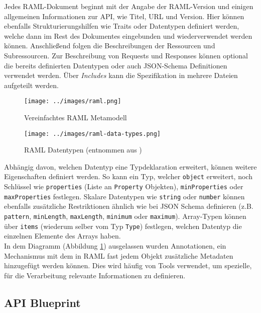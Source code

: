 Jedes RAML-Dokument beginnt mit der Angabe der RAML-Version und einigen allgemeinen Informationen zur API, wie Titel, URL und Version. Hier können ebenfalls Strukturierungshilfen wie Traits oder Datentypen definiert werden, welche dann im Rest des Dokumentes eingebunden und wiederverwendet werden können. Anschließend folgen die Beschreibungen der Ressourcen und Subressourcen. Zur Beschreibung von Requests und Responses können optional die bereits definierten Datentypen oder auch JSON-Schema Definitionen verwendet werden. Über \emph{Includes} kann die Spezifikation in mehrere Dateien aufgeteilt werden.

\begin{figure}[H]
  \texttt{[image: ../images/raml.png]}
  \caption{Vereinfachtes RAML Metamodell}
  \label{fig:raml}
\end{figure}

\begin{figure}[H]
  \texttt{[image: ../images/raml-data-types.png]}
  \caption{RAML Datentypen (entnommen aus \cite{ramlspec})}
\end{figure}

Abhängig davon, welchen Datentyp eine Typdeklaration erweitert, können weitere Eigenschaften definiert werden. So kann ein Typ, welcher \lstinline|object| erweitert, noch Schlüssel wie \lstinline|properties| (Liste an \lstinline|Property| Objekten), \lstinline|minProperties| oder \lstinline|maxProperties| festlegen. Skalare Datentypen wie \lstinline|string| oder \lstinline|number| können ebenfalls zusätzliche Restriktionen ähnlich wie bei JSON Schema definieren (z.B. \lstinline|pattern|, \lstinline|minLength|, \lstinline|maxLength|, \lstinline|minimum| oder \lstinline|maximum|). Array-Typen können über \lstinline|items| (wiederum selber vom Typ \lstinline|Type|) festlegen, welchen Datentyp die einzelnen Elemente des Arrays haben. \\

In dem Diagramm (Abbildung \ref{fig:raml}) ausgelassen wurden Annotationen, ein Mechanismus mit dem in RAML fast jedem Objekt zusätzliche Metadaten hinzugefügt werden können. Dies wird häufig von Tools verwendet, um spezielle, für die Verarbeitung relevante Informationen zu definieren.

\subsection{API Blueprint}

